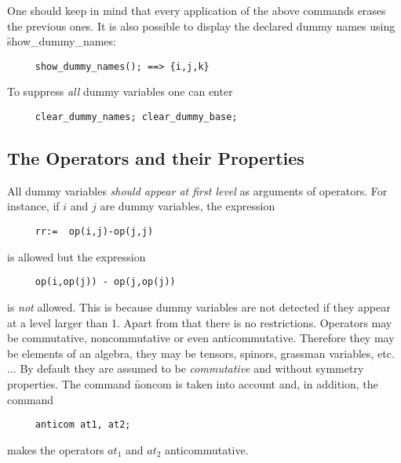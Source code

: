 One should keep in mind that every application of the above commands 
erases the previous ones. 
It is also possible to display the declared dummy names using 
\f{show\_dummy\_names}:
\hypertarget{command:SHOW_DUMMY_NAMES}{}
\begin{verbatim}
     show_dummy_names(); ==> {i,j,k}
\end{verbatim}
To suppress \emph{all} dummy variables one can enter
\begin{verbatim}
     clear_dummy_names; clear_dummy_base;
\end{verbatim}

\subsection{The Operators and their Properties}
All dummy variables \emph{should appear at first level}
as  arguments of operators. For instance, if $i$ and $j$ are 
dummy variables, the expression 
\begin{verbatim}
     rr:=  op(i,j)-op(j,j)
\end{verbatim}
is allowed but the expression 
\begin{verbatim}
     op(i,op(j)) - op(j,op(j))
\end{verbatim}
is \emph{not} allowed. This is because dummy variables are not detected 
if they appear at a level larger than 1. 
Apart from that there is no restrictions. Operators  may be 
commutative, noncommutative or even anticommutative. Therefore 
they may be elements of an algebra, they may be tensors,
spinors, grassman variables, etc. $\ldots$
By default they are assumed to be \emph{commutative} and without symmetry
properties. The {\REDUCE} command \f{noncom} is taken into account 
and, in addition, the command
\hypertarget{command:ANTICOM}{}
\begin{verbatim}
     anticom at1, at2;
\end{verbatim}
makes the operators $at_1$ and $at_2$ anticommutative.

